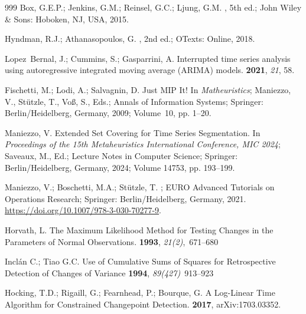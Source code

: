 \documentclass[mathematics,article,accept,pdftex,moreauthors]{Definitions/mdpi}
\begin{document}
\begin{thebibliography}{999}
Box, G.E.P.; Jenkins, G.M.; Reinsel, G.C.; Ljung, G.M.
, 5th ed.; John
  Wiley \& Sons: Hoboken, NJ, USA, 2015.

Hyndman, R.J.; Athanasopoulos, G.
, 2nd ed.; OTexts: Online,  2018.

Lopez~Bernal, J.; Cummins, S.; Gasparrini, A.
\newblock Interrupted time series analysis using autoregressive integrated
  moving average ({ARIMA}) models.
 {\bf 2021}, {\em 21}, 58.

Fischetti, M.; Lodi, A.; Salvagnin, D.
\newblock Just {MIP} It! In {\em Matheuristics}; Maniezzo, V., St{\"u}tzle, T.,
  Vo{\ss}, S., Eds.; Annals of Information
  Systems; Springer: Berlin/Heidelberg, Germany, 2009; Volume~10, pp. 1--20.

Maniezzo, V.
\newblock Extended Set Covering for Time Series Segmentation.
\newblock In \textit{Proceedings of the 15th Metaheuristics International Conference,
  MIC 2024}; Saveaux, M., Ed.; Lecture Notes in  Computer Science; Springer: Berlin/Heidelberg, Germany, 2024; Volume 14753, \linebreak  pp. 193--199.

Maniezzo, V.; Boschetti, M.A.; St{\"u}tzle, T.
; EURO Advanced
  Tutorials on Operations Research; Springer: Berlin/Heidelberg, Germany, 2021.
\newblock \url{https://doi.org/10.1007/978-3-030-70277-9}.

Horvath, L.
\newblock The Maximum Likelihood Method for Testing Changes in the Parameters of Normal Observations.
 {\bf 1993}, {\em 21(2)},~671--680

Inclán C.; Tiao G.C.
\newblock Use of Cumulative Sums of Squares for Retrospective Detection of Changes of Variance
 {\bf 1994}, {\em 89(427)}~913--923

Hocking, T.D.; Rigaill, G.; Fearnhead, P.; Bourque, G.
\newblock A Log-Linear Time Algorithm for Constrained Changepoint Detection.
 {\bf 2017}, arXiv:1703.03352.


\end{thebibliography}
\end{document}
